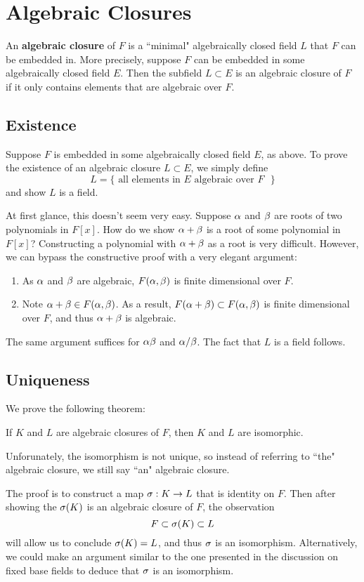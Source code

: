\section{Algebraic Closures}
An \textbf{algebraic closure} of $F$ is a ``minimal" algebraically closed field $L$ that $F$ can be embedded in. More precisely, suppose $F$ can be embedded in some algebraically closed field $E$. Then the subfield $L \subset E$ is an algebraic closure of $F$ if it only contains elements that are algebraic over $F$.

\subsection{Existence}
Suppose $F$ is embedded in some algebraically closed field $E$, as above. To prove the existence of an algebraic closure $L \subset E$, we simply define
\[
    L = \{\text{ all elements in $E$ algebraic over $F$ }\}
\]
and show $L$ is a field.

At first glance, this doesn't seem very easy. Suppose $\alpha$ and $\beta$ are roots of two polynomials in $F[x]$. How do we show $\alpha + \beta$ is a root of some polynomial in $F[x]$? Constructing a polynomial with $\alpha + \beta$ as a root is very difficult. However, we can bypass the constructive proof with a very elegant argument:
\begin{enumerate}
    \item As $\alpha$ and $\beta$ are algebraic, $F(\alpha, \beta)$ is finite dimensional over $F$.
    \item Note $\alpha + \beta \in F(\alpha, \beta)$. As a result, $F(\alpha + \beta) \subset F(\alpha, \beta)$ is finite dimensional over $F$, and thus $\alpha + \beta$ is algebraic.
\end{enumerate}
The same argument suffices for $\alpha\beta$ and $\alpha/\beta$. The fact that $L$ is a field follows.

\subsection{Uniqueness}
We prove the following theorem:
\begin{center}
    If $K$ and $L$ are algebraic closures of $F$, then $K$ and $L$ are isomorphic.
\end{center}
Unforunately, the isomorphism is not unique, so instead of referring to ``the" algebraic closure, we still say ``an" algebraic closure.

The proof is to construct a map $\sigma: K \rightarrow L$ that is identity on $F$. Then after showing the $\sigma(K)$ is an algebraic closure of $F$, the observation
\[
    F \subset \sigma(K) \subset L
\]
will allow us to conclude $\sigma(K) = L$, and thus $\sigma$ is an isomorphism. Alternatively, we could make an argument similar to the one presented in the discussion on fixed base fields to deduce that $\sigma$ is an isomorphism.

